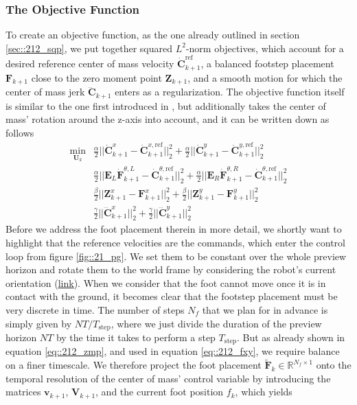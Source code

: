 \subsubsection{The Objective Function}
To create an objective function, as the one already outlined in section \ref{sec::212_sqp}, we put together squared $L^2$-norm objectives, which account for a desired reference center of mass velocity $\dot{\bm{C}}_{k+1}^\text{ref}$, a balanced footstep placement $\textbf{F}_{k+1}$ close to the zero moment point $\bm{Z}_{k+1}$, and a smooth motion for which the center of mass jerk $\dddot{\bm{C}}_{k+1}$ enters as a regularization. The objective function itself is similar to the one first introduced in \cite{herdt2010online}, but additionally takes the center of mass' rotation around the z-axis into account, and it can be written down as follows
\begin{align}
	\min_{\bm{U}_k} &\frac{\alpha}{2}||\dot{\bm{C}}^x_{k+1} - \dot{\bm{C}}_{k+1}^{x,\text{ref}}||_2^2 + \frac{\alpha}{2}||\dot{\bm{C}}^y_{k+1} - \dot{\bm{C}}_{k+1}^{y,\text{ref}}||_2^2 
	\label{eq::212_dcxy}\\
	&\frac{\alpha}{2}||\bm{E}_L\dot{\bm{F}}^{\theta,L}_{k+1} - \dot{\bm{C}}_{k+1}^{\theta,\text{ref}}||_2^2 + 	\frac{\alpha}{2}||\bm{E}_R\dot{\bm{F}}^{\theta,R}_{k+1} - \dot{\bm{C}}_{k+1}^{\theta,\text{ref}}||_2^2 
	\label{eq::212_dftheta} \\
	&\frac{\beta}{2}||\bm{Z}^x_{k+1}-\bm{F}^x_{k+1}||^2_2 + \frac{\beta}{2}||\bm{Z}^y_{k+1}-\bm{F}^y_{k+1}||^2_2 
	\label{eq::212_fxy}\\
	&\frac{\gamma}{2}||\dddot{\bm{C}}_{k+1}^x||^2_2 + \frac{\gamma}{2}||\dddot{\bm{C}}_{k+1}^y||^2_2	
	\label{eq::212_dddcxy}
\end{align}
Before we address the foot placement therein in more detail, we shortly want to highlight that the reference velocities are the commands, which enter the control loop from figure \ref{fig::21_pg}. We set them to be constant over the whole preview horizon and rotate them to the world frame  by considering the robot's current orientation (\href{https://github.com/mhubii/nmpc_pattern_generator/blob/5a213044c927dc6aac9f7e32ce1e5fb472cd67bb/libs/pattern_generator/src/base_generator.cpp#L324}{\underline{link}}). When we consider that the foot cannot move once it is in contact with the ground, it becomes clear that the footstep placement must be very discrete in time. The number of steps $N_f$ that we plan for in advance is simply given by $NT/T_\text{step}$, where we just divide the duration of the preview horizon $NT$ by the time it takes to perform a step $T_\text{step}$. But as already shown in equation \ref{eq::212_zmp}, and used in equation \ref{eq::212_fxy}, we require balance on a finer timescale. We therefore project the foot placement $\tilde{\bm{F}}_k\in\mathbb{R}^{N_f\times1}$ onto the temporal resolution of the center of mass' control variable by introducing the matrices $\bm{v}_{k+1}$, $\bm{V}_{k+1}$, and the current foot position $f_k$, which yields
